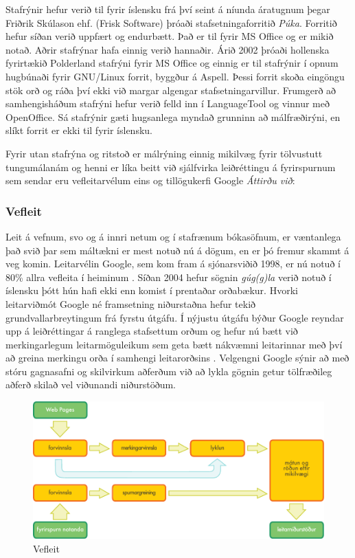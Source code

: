 \begin{multicols}{2}
Stafrýnir hefur verið til fyrir íslensku frá því seint á níunda áratugnum þegar Friðrik Skúlason ehf. (Frisk Software) þróaði stafsetningaforritið \textit{Púka}. Forritið hefur síðan verið uppfært og endurbætt. Það er til fyrir MS Office og er mikið notað. Aðrir stafrýnar hafa einnig verið hannaðir. Árið 2002 þróaði hollenska fyrirtækið Polderland stafrýni fyrir MS Office og einnig er til stafrýnir í opnum hugbúnaði fyrir GNU/Linux forrit, byggður á Aspell. Þessi forrit skoða eingöngu stök orð og ráða því ekki við margar algengar stafsetningarvillur. Frumgerð að samhengisháðum stafrýni hefur verið felld inn í LanguageTool \cite{lto1} og vinnur með OpenOffice. Sá stafrýnir gæti hugsanlega myndað grunninn að mál\-fræði\-rýni, en slíkt forrit er ekki til fyrir íslensku. 

Fyrir utan stafrýna og ritstoð er málrýning einnig mikilvæg fyrir tölvustutt tungumálanám og henni er líka beitt við sjálfvirka leiðréttingu á fyrirspurnum sem sendar eru vefleitarvélum eins og tillögukerfi Google \textit{Áttirðu við}:

\subsubsection{Vefleit}

Leit á vefnum, svo og á innri netum og í stafrænum bókasöfnum, er væntanlega það svið þar sem máltækni er mest notuð nú á dögum, en er þó fremur skammt á veg komin. Leitarvélin Google, sem kom fram á sjónarsviðið 1998, er nú notuð í 80\% allra vefleita í heiminum \cite{spi1}.  Síðan 2004 hefur sögnin  \textit{gúg(g)la} verið notuð í íslensku þótt hún hafi ekki enn komist í prentaðar orðabækur. Hvorki leitarviðmót Google né framsetning niðurstaðna hefur tekið grundvallarbreytingum frá fyrstu útgáfu. Í nýjustu útgáfu býður Google reyndar upp á leiðréttingar á ranglega stafsettum orðum og hefur nú bætt við merkingarlegum leitarmöguleikum sem geta bætt nákvæmni leitarinnar með því að greina merkingu orða í samhengi leitarorðsins \cite{pc1}.  Velgengni Google sýnir að með stóru gagnasafni og skilvirkum aðferðum við að lykla gögnin getur tölfræðileg aðferð skilað vel viðunandi niðurstöðum.

\begin{figure}[htb]
  \center
  \includegraphics[width=\textwidth]{../_media/icelandic/web_search_architecture}
  \caption{Vefleit}
  \label{fig:websearcharch_is}
\end{figure}


\end{multicols}
